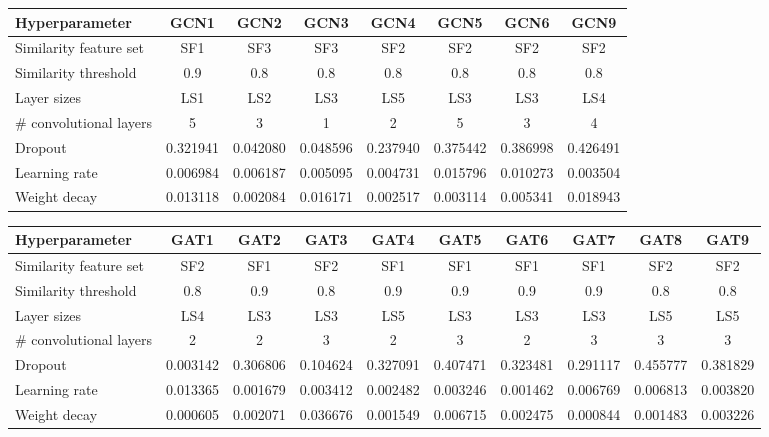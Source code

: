 \begin{sidewaystable}[h!]
    \caption{Shortlisted population graph and GCN model parameter combinations during the model selection process.}\label{table:shortlisted-gcn}
    \centering
    \centering
    \small
    \begin{tabular}{lccccccc}
        \hline
    \textbf{Hyperparameter} & \textbf{GCN1} & \textbf{GCN2} & \textbf{GCN3} & \textbf{GCN4} & \textbf{GCN5} & \textbf{GCN6} & \textbf{GCN9} \\  \hline
        Similarity feature set &  SF1 & SF3 & SF3 & SF2 & SF2 & SF2 & SF2 \\
        Similarity threshold & 0.9 & 0.8 & 0.8 & 0.8 & 0.8 & 0.8 & 0.8\\ \hline
        Layer sizes & LS1 &  LS2 & LS3 & LS5 & LS3 & LS3 & LS4 \\ 
        \# convolutional layers & 5 & 3& 1& 2& 5& 3& 4\\ 
        Dropout &  0.321941 & 0.042080& 0.048596& 0.237940& 0.375442& 0.386998& 0.426491\\ 
        Learning rate & 0.006984& 0.006187& 0.005095& 0.004731& 0.015796& 0.010273& 0.003504\\ 
        Weight decay & 0.013118& 0.002084& 0.016171& 0.002517& 0.003114& 0.005341& 0.018943\\ \hline
\end{tabular}
 
\bigskip\bigskip

    \caption{Shortlisted population graph and GAT model parameter combinations during the model selection process.}\label{table:shortlisted-gat}
    \centering
    \small
    \begin{tabular}{lccccccccc}
        \hline
    \textbf{Hyperparameter} & \textbf{GAT1} & \textbf{GAT2} & \textbf{GAT3} & \textbf{GAT4} & \textbf{GAT5} & \textbf{GAT6} & \textbf{GAT7} & \textbf{GAT8} & \textbf{GAT9} \\  \hline
    Similarity feature set & SF2 & SF1 & SF2& SF1 & SF1& SF1& SF1& SF2& SF2\\
    Similarity threshold & 0.8 & 0.9& 0.8& 0.9& 0.9& 0.9& 0.9& 0.8& 0.8\\ \hline
    Layer sizes& LS4& LS3& LS3& LS5& LS3& LS3& LS3& LS5& LS5\\
    \# convolutional layers & 2& 2& 3& 2& 3& 2& 3& 3& 3\\
    Dropout & 0.003142& 0.306806& 0.104624& 0.327091& 0.407471& 0.323481& 0.291117& 0.455777& 0.381829\\
    Learning rate& 0.013365& 0.001679& 0.003412& 0.002482& 0.003246& 0.001462& 0.006769& 0.006813& 0.003820\\
    Weight decay& 0.000605& 0.002071& 0.036676& 0.001549& 0.006715& 0.002475& 0.000844& 0.001483& 0.003226\\ \hline
\end{tabular}
    \end{sidewaystable}